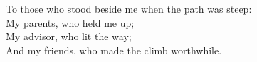 \begin{dedication}
\setsinglespacing
\raggedright %
\parindent0pt\parskip\baselineskip
To those who stood beside me when the path was steep:\\
My parents, who held me up;\\
My advisor, who lit the way;\\
And my friends, who made the climb worthwhile.
\end{dedication}